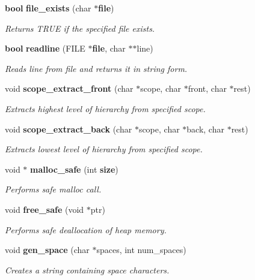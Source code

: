 \begin{CompactItemize}
{\bf bool} {\bf file\_\-exists} (char $\ast${\bf file})
\begin{CompactList}\small\item\em Returns TRUE if the specified file exists.\item\end{CompactList}\item 
{\bf bool} {\bf readline} (FILE $\ast${\bf file}, char $\ast$$\ast$line)
\begin{CompactList}\small\item\em Reads line from file and returns it in string form.\item\end{CompactList}\item 
void {\bf scope\_\-extract\_\-front} (char $\ast$scope, char $\ast$front, char $\ast$rest)
\begin{CompactList}\small\item\em Extracts highest level of hierarchy from specified scope.\item\end{CompactList}\item 
void {\bf scope\_\-extract\_\-back} (char $\ast$scope, char $\ast$back, char $\ast$rest)
\begin{CompactList}\small\item\em Extracts lowest level of hierarchy from specified scope.\item\end{CompactList}\item 
void $\ast$ {\bf malloc\_\-safe} (int {\bf size})
\begin{CompactList}\small\item\em Performs safe malloc call.\item\end{CompactList}\item 
void {\bf free\_\-safe} (void $\ast$ptr)
\begin{CompactList}\small\item\em Performs safe deallocation of heap memory.\item\end{CompactList}\item 
void {\bf gen\_\-space} (char $\ast$spaces, int num\_\-spaces)
\begin{CompactList}\small\item\em Creates a string containing space characters.\item\end{CompactList}\end{CompactItemize}


